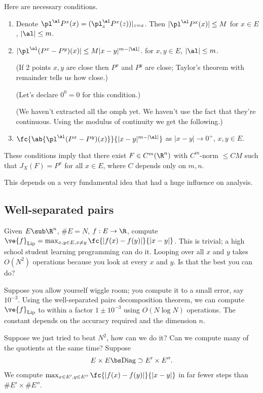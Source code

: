 Here are necessary conditions.
\begin{enumerate}
\item
Denote $\pl^\al P^x(x) = (\pl_z^\al P^x(z))|_{z=x}$. Then $|\pl^\al P^x(x)|\le M$ for $x\in E$, $|\al|\le m$.
\item
$|\pl^\al(P^x - P^y)(x)|\le M|x-y|^{m-|\al|}$. for $x,y\in E$, $|\al|\le m$.

(If 2 points $x,y$ are close then $P^x$ and $P^y$ are close; Taylor's theorem with remainder tells us how close.)

(Let's declare $0^0=0$ for this condition.)

(We haven't extracted all the omph yet. We haven't use the fact that they're continuous. Using the modulus of continuity we get the following.)
\item
$\fc{\ab{\pl^\al (P^x - P^y)(x)}}{|x-y|^{m-|\al|}}$ as $|x-y|\to 0^+$, $x,y\in E$. 
\end{enumerate}
\begin{thm}
These conditions imply that there exist $F\in C^m(\R^n)$ with $C^m$-norm $\le CM$ such that $J_X(F) = P^x$ for all $x\in E$, where $C$ depends only on $m,n$.
\end{thm}

This depends on a very fundamental idea that had a huge influence on analysis.

\subsection{Well-separated pairs}

Given $E\sub \R^n$, $\# E=N$, $f:E\to \R$, compute $\ve{f}_{\text{Lip}} = \max_{x,y\in E,x\ne y} \fc{|f(x)-f(y)|}{|x-y|}$. This is trivial; a high school student learning programming can do it. Looping over all $x$ and $y$ takes $O(N^2)$ operations because you look at every $x$ and $y$. Is that the best you can do?

Suppose you allow yourself wiggle room; you compute it to a small error, say $10^{-3}$. Using the well-separated pairs decomposition theorem, we can compute $\ve{f}_{\text{Lip}}$ to within a factor $1\pm 10^{-3}$ using $O(N\log N)$ operations. The constant depends on the accuracy required and the dimension $n$.

Suppose we just tried to beat $N^2$, how can we do it? Can we compute many of the quotients at the same time? Suppose
\begin{align}
E\times E \bs \text{Diag} \supset E'\times E''.
\end{align}
We compute $\max_{x\in E',y\in E''}\fc{|f(x)-f(y)|}{|x-y|}$ in far fewer steps than $\# E' \times \# E''$.  

